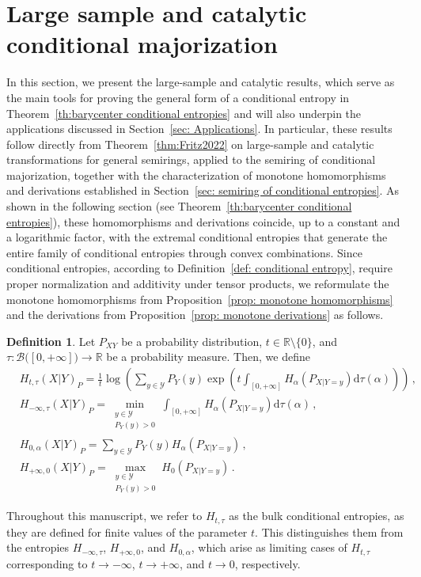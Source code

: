 \documentclass[aps,pra,11pt,onecolumn,nofootinbib,tightenlines]{revtex4-2}
\theoremstyle{definition}
\newtheorem{definition}[theorem]{Definition}
\def \d {\mathrm{d}}
\newcommand{\Y}{\mathcal{Y}}
\newcommand{\R}{\mathbb{R}}
\newcommand{\mc}[1]{\mathcal{#1}}
\newcommand{\mb}[1]{\mathbb{#1}}
\begin{document}
\section{Large sample and catalytic conditional majorization}
\label{sec: large sample}
In this section, we present the large-sample and catalytic results, which serve as the main tools for proving the general form of a conditional entropy in Theorem~\ref{th:barycenter conditional entropies} and will also underpin the applications discussed in Section~\ref{sec: Applications}.
In particular, these results follow directly from Theorem~\ref{thm:Fritz2022} on large-sample and catalytic transformations for general semirings, applied to the semiring of conditional majorization, together with the characterization of monotone homomorphisms and derivations established in Section~\ref{sec: semiring of conditional entropies}.
As shown in the following section (see Theorem~\ref{th:barycenter conditional entropies}), these homomorphisms and derivations coincide, up to a constant and a logarithmic factor, with the extremal conditional entropies that generate the entire family of conditional entropies through convex combinations.
Since conditional entropies, according to Definition~\ref{def: conditional entropy}, require proper normalization and additivity under tensor products, we reformulate the monotone homomorphisms from Proposition~\ref{prop: monotone homomorphisms} and the derivations from Proposition~\ref{prop: monotone derivations} as follows.



\begin{definition}
\label{def: extremal entropies}
Let $P_{XY}$ be a probability distribution, $t\in\R\setminus\{0\}$, and $\tau:\mc B\big([0,+\infty]\big)\to\mb R$ be a probability measure. Then, we define
\begin{align}
    &H_{t,\tau}(X|Y)_P = \frac{1}{t}\log \left(\sum_{y \in \Y} P_Y(y)\exp{\left(t\int_{[0,+\infty]}H_\alpha(P_{X|Y=y})\d\tau(\alpha)\right)}\right) \,, \label{eq:TempEnt}\\
    & H_{-\infty,\tau}(X|Y)_P =  \min \limits_{\substack{y \in \mathcal{Y} \\ P_Y( y) > 0}}\int_{[0,+\infty]}H_\alpha(P_{X|Y=y})\d\tau(\alpha) \,, \label{eq:TropEnt}\\
    & H_{0,\alpha}(X|Y)_P =  \sum_{y \in \Y} P_Y(y)H_\alpha(P_{X|Y=y})\,,\label{eq:DerivEnt} \\
    & H_{+\infty,0}(X|Y)_P =  \max \limits_{\substack{y \in \mathcal{Y} \\ P_Y( y) > 0}} H_0(P_{X|Y=y}) \,. \label{eq:TropEntno}
\end{align}
\end{definition}
Throughout this manuscript, we refer to \(H_{t,\tau}\) as the bulk conditional entropies, as they are defined for finite values of the parameter \(t\). This distinguishes them from the entropies \(H_{-\infty,\tau}\), \(H_{+\infty,0}\), and \(H_{0,\alpha}\), which arise as limiting cases of $H_{t,\tau}$ corresponding to \(t \to -\infty\), \(t \to +\infty\), and \(t \to 0\), respectively.
\end{document}
